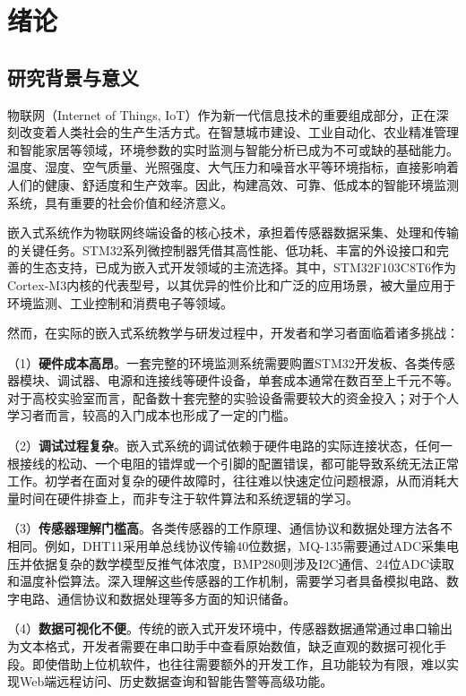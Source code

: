 \documentclass[12pt,a4paper]{ctexart}
\begin{document}
\section{绪论}

\subsection{研究背景与意义}

物联网（Internet of Things, IoT）作为新一代信息技术的重要组成部分，正在深刻改变着人类社会的生产生活方式。在智慧城市建设、工业自动化、农业精准管理和智能家居等领域，环境参数的实时监测与智能分析已成为不可或缺的基础能力。温度、湿度、空气质量、光照强度、大气压力和噪音水平等环境指标，直接影响着人们的健康、舒适度和生产效率。因此，构建高效、可靠、低成本的智能环境监测系统，具有重要的社会价值和经济意义。

嵌入式系统作为物联网终端设备的核心技术，承担着传感器数据采集、处理和传输的关键任务。STM32系列微控制器凭借其高性能、低功耗、丰富的外设接口和完善的生态支持，已成为嵌入式开发领域的主流选择。其中，STM32F103C8T6作为Cortex-M3内核的代表型号，以其优异的性价比和广泛的应用场景，被大量应用于环境监测、工业控制和消费电子等领域。

然而，在实际的嵌入式系统教学与研发过程中，开发者和学习者面临着诸多挑战：

（1）\textbf{硬件成本高昂}。一套完整的环境监测系统需要购置STM32开发板、各类传感器模块、调试器、电源和连接线等硬件设备，单套成本通常在数百至上千元不等。对于高校实验室而言，配备数十套完整的实验设备需要较大的资金投入；对于个人学习者而言，较高的入门成本也形成了一定的门槛。

（2）\textbf{调试过程复杂}。嵌入式系统的调试依赖于硬件电路的实际连接状态，任何一根接线的松动、一个电阻的错焊或一个引脚的配置错误，都可能导致系统无法正常工作。初学者在面对复杂的硬件故障时，往往难以快速定位问题根源，从而消耗大量时间在硬件排查上，而非专注于软件算法和系统逻辑的学习。

（3）\textbf{传感器理解门槛高}。各类传感器的工作原理、通信协议和数据处理方法各不相同。例如，DHT11采用单总线协议传输40位数据，MQ-135需要通过ADC采集电压并依据复杂的数学模型反推气体浓度，BMP280则涉及I2C通信、24位ADC读取和温度补偿算法。深入理解这些传感器的工作机制，需要学习者具备模拟电路、数字电路、通信协议和数据处理等多方面的知识储备。

（4）\textbf{数据可视化不便}。传统的嵌入式开发环境中，传感器数据通常通过串口输出为文本格式，开发者需要在串口助手中查看原始数值，缺乏直观的数据可视化手段。即使借助上位机软件，也往往需要额外的开发工作，且功能较为有限，难以实现Web端远程访问、历史数据查询和智能告警等高级功能。
\end{document}
